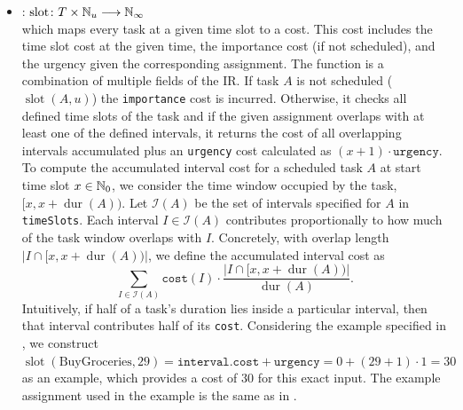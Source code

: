 \begin{itemize}
      \item {}: $\operatorname{slot} \colon T \times \mathbb{N}_u \longrightarrow \mathbb{N}_{\infty}$\\
            which maps every task at a given time slot to a cost. This cost includes the time slot cost at the given time, the importance cost (if not scheduled), and the urgency given the corresponding assignment. The function is a combination of multiple fields of the \Ac{IR}. If task $A$ is not scheduled ($\operatorname{slot}(A, u)$) the \texttt{importance} cost is incurred. Otherwise, it checks all defined time slots of the task and if the given assignment overlaps with at least one of the defined intervals, it returns the cost of all overlapping intervals accumulated plus an \texttt{urgency} cost calculated as
            $(x + 1) \cdot \texttt{urgency}$. To compute the accumulated interval cost for a scheduled task $A$ at start time slot $x \in \mathbb{N}_0$, we consider the time window occupied by the task,
            $[x, x + \operatorname{dur}(A))$. Let $\mathcal{I}(A)$ be the set of intervals specified for $A$ in \texttt{timeSlots}. Each interval $I \in \mathcal{I}(A)$ contributes proportionally to how much of the task window overlaps with $I$. Concretely, with overlap length $\lvert I \cap [x, x + \operatorname{dur}(A)) \rvert$, we define the accumulated interval cost as
            \[
                  \sum_{I \in \mathcal{I}(A)} \texttt{cost}(I) \cdot \frac{\lvert I \cap [x, x + \operatorname{dur}(A)) \rvert}{\operatorname{dur}(A)}.
            \]
            Intuitively, if half of a task's duration lies inside a particular interval, then that interval contributes half of its \texttt{cost}. Considering the example specified in , we construct $\operatorname{slot}(\text{BuyGroceries}, 29) = \texttt{interval.cost} + \texttt{urgency} = 0 + (29 + 1) \cdot 1 = 30$ as an example, which provides a cost of $30$ for this exact input. The example assignment used in the example is the same as in .


\end{itemize}
